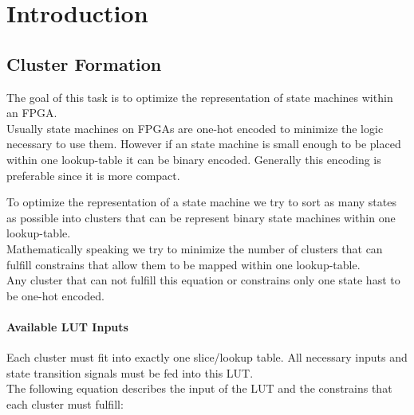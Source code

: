 \chapter{Introduction}
\label{cha:introduction}





\section{Cluster Formation}
\label{sec:clusterSearch}

The goal of this task is to optimize the representation of state machines within an FPGA.\\
Usually state machines on FPGAs are one-hot encoded to minimize the logic necessary to use them. However if an state machine is small enough to be placed within one lookup-table it can be binary encoded. Generally this encoding is preferable since it is more compact. 

To optimize the representation of a state machine we try to sort as many states as possible into clusters that can be represent binary state machines within one lookup-table.\\
Mathematically speaking we try to minimize the number of clusters that can fulfill constrains that allow them to be mapped within one lookup-table.\\
Any cluster that can not fulfill this equation or constrains only one state hast to be one-hot encoded. 



\subsubsection{Available LUT Inputs}
\label{subsubsec:LUTInputs}
Each cluster must fit into exactly one slice/lookup table. All necessary inputs and state transition signals must be fed into this LUT. \\
The following equation describes the input of the LUT and the constrains that each cluster must fulfill:

